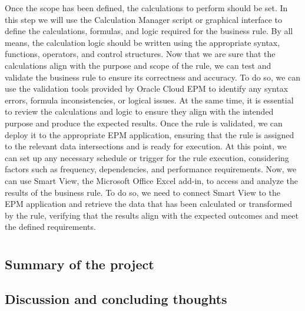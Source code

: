 \documentclass[12pt,a4paper,openright,twoside]{book}
\begin{document}
Once the scope has been defined, the calculations to perform should be set.
%
In this step we will use the Calculation Manager script or graphical interface to define the calculations, formulas, and logic required for the business rule. 
%
By all means, the calculation logic should be written using the appropriate syntax, functions, operators, and control structures.
%
Now that we are sure that the calculations align with the purpose and scope of the rule, we can test and validate the business rule to ensure its correctness and accuracy. 
%
To do so, we can use the validation tools provided by Oracle Cloud EPM to identify any syntax errors, formula inconsistencies, or logical issues. 
%
At the same time, it is essential to review the calculations and logic to ensure they align with the intended purpose and produce the expected results.
%
Once the rule is validated, we can deploy it to the appropriate EPM application, ensuring that the rule is assigned to the relevant data intersections and is ready for execution. 
%
At this point, we can set up any necessary schedule or trigger for the rule execution, considering factors such as frequency, dependencies, and performance requirements.
%
Now, we can use Smart View, the Microsoft Office Excel add-in, to access and analyze the results of the business rule.
%
To do so, we need to connect Smart View to the EPM application and retrieve the data that has been calculated or transformed by the rule, verifying that the results align with the expected outcomes and meet the defined requirements.



\chapter{\conclusionsname}
\label{chap:conclusions}

\section{Summary of the project}

\section{Discussion and concluding thoughts}



\nocite{*} %


\end{document}
